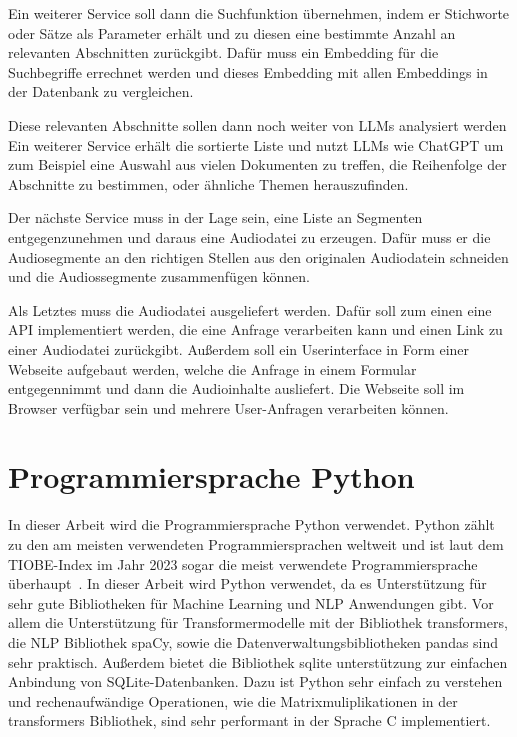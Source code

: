 Ein weiterer Service soll dann die Suchfunktion übernehmen, indem er Stichworte oder Sätze als Parameter erhält und zu diesen eine bestimmte Anzahl an relevanten Abschnitten zurückgibt.
Dafür muss ein Embedding für die Suchbegriffe errechnet werden und dieses Embedding mit allen Embeddings in der Datenbank zu vergleichen.

Diese relevanten Abschnitte sollen dann noch weiter von LLMs analysiert werden
Ein weiterer Service erhält die sortierte Liste und nutzt LLMs wie ChatGPT um zum Beispiel eine Auswahl aus vielen Dokumenten zu treffen, die Reihenfolge der Abschnitte zu bestimmen, oder ähnliche Themen herauszufinden.

Der nächste Service muss in der Lage sein, eine Liste an Segmenten entgegenzunehmen und daraus eine Audiodatei zu erzeugen.
Dafür muss er die Audiosegmente an den richtigen Stellen aus den originalen Audiodatein schneiden und die Audiossegmente zusammenfügen können.

Als Letztes muss die Audiodatei ausgeliefert werden. 
Dafür soll zum einen eine API implementiert werden, die eine Anfrage verarbeiten kann und einen Link zu einer Audiodatei zurückgibt.
Außerdem soll ein Userinterface in Form einer Webseite aufgebaut werden, welche die Anfrage in einem Formular entgegennimmt und dann die Audioinhalte ausliefert.
Die Webseite soll im Browser verfügbar sein und mehrere User-Anfragen verarbeiten können.

\section{Programmiersprache Python}

In dieser Arbeit wird die Programmiersprache Python verwendet.
Python zählt zu den am meisten verwendeten Programmiersprachen weltweit und ist laut dem TIOBE-Index im Jahr 2023 sogar die meist verwendete Programmiersprache überhaupt~\cite{index2023}.
In dieser Arbeit wird Python verwendet, da es Unterstützung für sehr gute Bibliotheken für Machine Learning und NLP Anwendungen gibt.
Vor allem die Unterstützung für Transformermodelle mit der Bibliothek transformers, die NLP Bibliothek spaCy, sowie die Datenverwaltungsbibliotheken pandas sind sehr praktisch.
Außerdem bietet die Bibliothek sqlite unterstützung zur einfachen Anbindung von SQLite-Datenbanken. 
Dazu ist Python sehr einfach zu verstehen und rechenaufwändige Operationen, wie die Matrixmuliplikationen in der transformers Bibliothek, sind sehr performant in der Sprache C implementiert.


